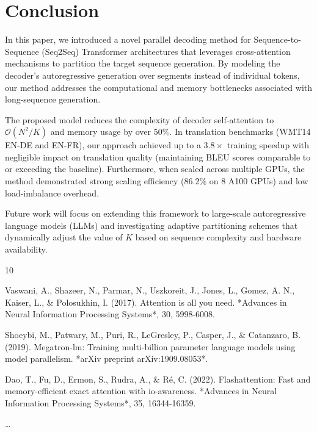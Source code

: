 \documentclass[11pt,a4paper]{article}
\begin{document}
\section{Conclusion}
In this paper, we introduced a novel parallel decoding method for Sequence-to-Sequence (Seq2Seq) Transformer architectures that leverages cross-attention mechanisms to partition the target sequence generation. By modeling the decoder's autoregressive generation over segments instead of individual tokens, our method addresses the computational and memory bottlenecks associated with long-sequence generation. 

The proposed model reduces the complexity of decoder self-attention to $\mathcal{O}(N^2/K)$ and memory usage by over $50\%$. In translation benchmarks (WMT14 EN-DE and EN-FR), our approach achieved up to a $3.8\times$ training speedup with negligible impact on translation quality (maintaining BLEU scores comparable to or exceeding the baseline). Furthermore, when scaled across multiple GPUs, the method demonstrated strong scaling efficiency ($86.2\%$ on 8 A100 GPUs) and low load-imbalance overhead. 

Future work will focus on extending this framework to large-scale autoregressive language models (LLMs) and investigating adaptive partitioning schemes that dynamically adjust the value of $K$ based on sequence complexity and hardware availability.

\begin{thebibliography}{10}

 Vaswani, A., Shazeer, N., Parmar, N., Uszkoreit, J., Jones, L., Gomez, A. N., Kaiser, L., \& Polosukhin, I. (2017). Attention is all you need. *Advances in Neural Information Processing Systems*, 30, 5998-6008.

 Shoeybi, M., Patwary, M., Puri, R., LeGresley, P., Casper, J., \& Catanzaro, B. (2019). Megatron-lm: Training multi-billion parameter language models using model parallelism. *arXiv preprint arXiv:1909.08053*.

 Dao, T., Fu, D., Ermon, S., Rudra, A., \& Ré, C. (2022). Flashattention: Fast and memory-efficient exact attention with io-awareness. *Advances in Neural Information Processing Systems*, 35, 16344-16359.

\dots
\end{thebibliography}
\end{document}
